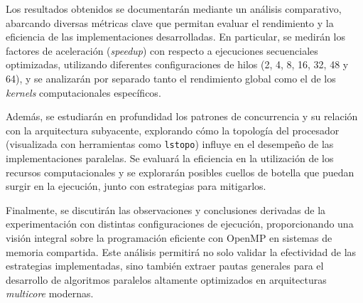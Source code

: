 Los resultados obtenidos se documentarán mediante un análisis comparativo, abarcando diversas métricas clave que permitan evaluar el rendimiento y la eficiencia de las implementaciones desarrolladas. En particular, se medirán los factores de aceleración (\textit{speedup}) con respecto a ejecuciones secuenciales optimizadas, utilizando diferentes configuraciones de hilos (2, 4, 8, 16, 32, 48 y 64), y se analizarán por separado tanto el rendimiento global como el de los \textit{kernels} computacionales específicos.

Además, se estudiarán en profundidad los patrones de concurrencia y su relación con la arquitectura subyacente, explorando cómo la topología del procesador (visualizada con herramientas como \texttt{lstopo}) influye en el desempeño de las implementaciones paralelas. Se evaluará la eficiencia en la utilización de los recursos computacionales y se explorarán posibles cuellos de botella que puedan surgir en la ejecución, junto con estrategias para mitigarlos.

Finalmente, se discutirán las observaciones y conclusiones derivadas de la experimentación con distintas configuraciones de ejecución, proporcionando una visión integral sobre la programación eficiente con OpenMP en sistemas de memoria compartida. Este análisis permitirá no solo validar la efectividad de las estrategias implementadas, sino también extraer pautas generales para el desarrollo de algoritmos paralelos altamente optimizados en arquitecturas \textit{multicore} modernas.